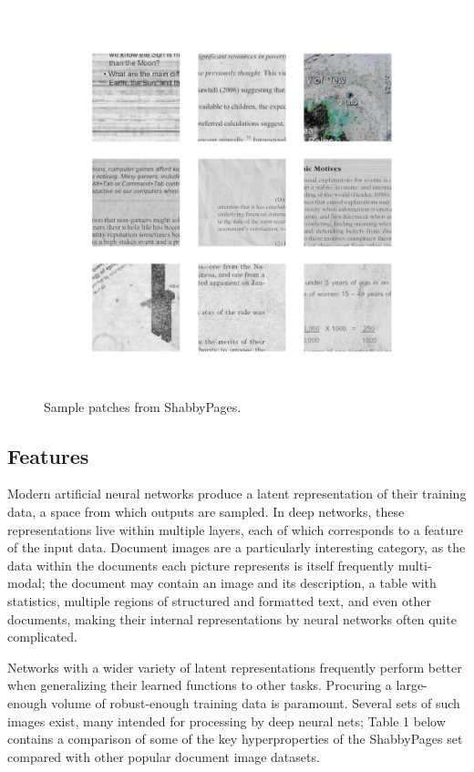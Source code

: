 \documentclass[runningheads]{llncs}
\begin{document}
\begin{figure}
\centering
\includegraphics[width=0.98\columnwidth, frame]{matrix.png}
\caption{Sample patches from ShabbyPages.} \label{fig1}
\end{figure}

\subsection{Features}
Modern artificial neural networks produce a latent representation of their training data, a space from which outputs are sampled.
In deep networks, these representations live within multiple layers, each of which corresponds to a feature of the input data.
Document images are a particularly interesting category, as the data within the documents each picture represents is itself frequently multi-modal; the document may contain an image and its description, a table with statistics, multiple regions of structured and formatted text, and even other documents, making their internal representations by neural networks often quite complicated.

Networks with a wider variety of latent representations frequently perform better when generalizing their learned functions to other tasks.
Procuring a large-enough volume of robust-enough training data is paramount.
Several sets of such images exist, many intended for processing by deep neural nets; Table 1 below contains a comparison of some of the key hyperproperties of the ShabbyPages set compared with other popular document image datasets.
\end{document}
